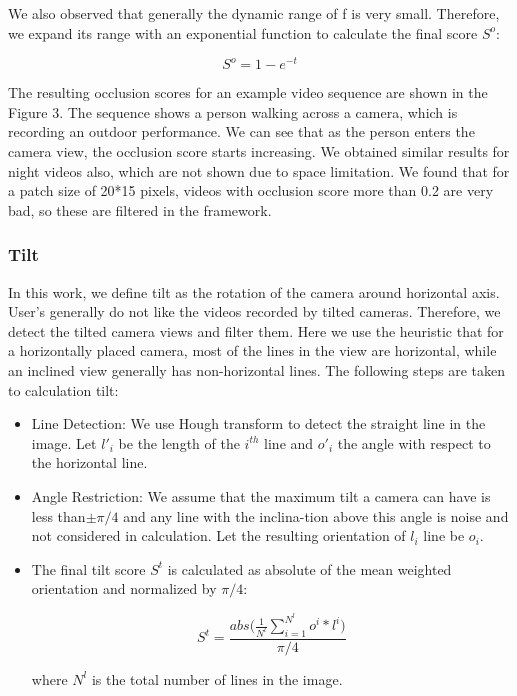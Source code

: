 \documentclass{sig-alternate}
\begin{document}
We also observed that generally the dynamic range of f is very small. Therefore, we expand its range with an exponential function to calculate the final score $S^o$:

\begin{displaymath}{S^o = 1- e^{-t}}\end{displaymath}


The resulting occlusion scores for an example video sequence are shown in the Figure 3. The sequence shows a person walking
across a camera, which is recording an outdoor performance. We
can see that as the person enters the camera view, the occlusion
score starts increasing. We obtained similar results for night videos
also, which are not shown due to space limitation. We found that
for a patch size of 20*15 pixels, videos with occlusion score more
than 0.2 are very bad, so these are filtered in the framework.
\subsubsection{Tilt}
In this work, we define tilt as the rotation of the camera around
horizontal axis. User’s generally do not like the videos recorded
by tilted cameras. Therefore, we detect the tilted camera views
and filter them. Here we use the heuristic that for a horizontally
placed camera, most of the lines in the view are horizontal, while
an inclined view generally has non-horizontal lines. The following
steps are taken to calculation tilt:

\begin{itemize}
    \item Line Detection: We use Hough transform to detect the straight line in the image. Let $l'_i$ be the length of the $i^{th}$ line and  $o'_i$ the angle with respect to the horizontal line.
    \item Angle Restriction: We assume that the maximum tilt a camera can have is less than$\pm \pi/4$  and any line with the inclina-tion above this angle is noise and not considered in calculation. Let the resulting orientation of $l_i$ line be $o_i$.
    \item The final tilt score $S^t$ is calculated as absolute of the mean weighted orientation and normalized by $\pi/4$:

    \begin{equation}
    S^t = \frac{abs \Big(\frac{1}{N^l} \sum_{i=1}^{N^l} o^i * l^i\Big)}{\pi/4}
\end{equation}


    
    
    
    where $N^l$ is the total number of lines in the image.

\end{itemize}
\end{document}

